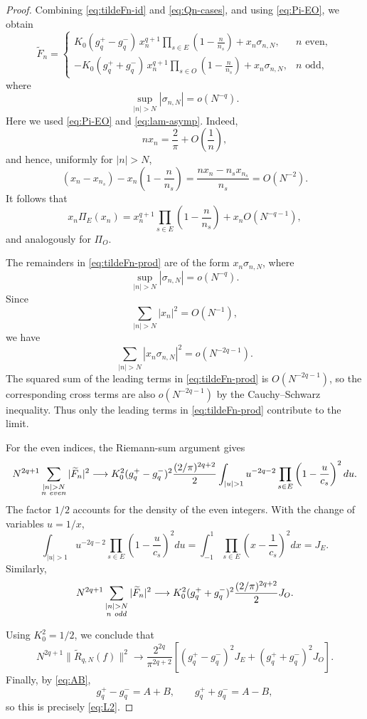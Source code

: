 \documentclass[10pt,a4paper]{amsart}
\begin{document}
\begin{proof}
Combining \eqref{eq:tildeFn-id} and \eqref{eq:Qn-cases}, and using
\eqref{eq:Pi-EO}, we obtain
\begin{equation}\label{eq:tildeFn-prod}
\widetilde F_n
=
\begin{cases}
\displaystyle
K_0(g_q^+-g_q^-)\,
x_n^{q+1}
\prod_{s\in E}
\left(1-\frac{n}{n_s}\right)
+x_n\sigma_{n,N},
& n\text{ even},
\\[4mm]
\displaystyle
-K_0(g_q^++g_q^-)\,
x_n^{q+1}
\prod_{s\in O}
\left(1-\frac{n}{n_s}\right)
+x_n\sigma_{n,N},
& n\text{ odd},
\end{cases}
\end{equation}
where
\[
\sup_{|n|>N}|\sigma_{n,N}|=o(N^{-q}).
\]
Here we used \eqref{eq:Pi-EO} and \eqref{eq:lam-asymp}. Indeed,
\[
nx_n=\frac{2}{\pi}+O\!\left(\frac{1}{n}\right),
\]
and hence, uniformly for $|n|>N$,
\[
(x_n-x_{n_s})
-
x_n\left(1-\frac{n}{n_s}\right)
=
\frac{nx_n-n_sx_{n_s}}{n_s}
=
O(N^{-2}).
\]
It follows that
\[
x_n\Pi_E(x_n)
=
x_n^{q+1}
\prod_{s\in E}
\left(1-\frac{n}{n_s}\right)
+
x_nO(N^{-q-1}),
\]
and analogously for $\Pi_O$.

The remainders in \eqref{eq:tildeFn-prod} are of the form
$x_n\sigma_{n,N}$, where
\[
\sup_{|n|>N}|\sigma_{n,N}|=o(N^{-q}).
\]
Since
\[
\sum_{|n|>N}|x_n|^2=O(N^{-1}),
\]
we have
\[
\sum_{|n|>N}|x_n\sigma_{n,N}|^2
=
o(N^{-2q-1}).
\]
The squared sum of the leading terms in \eqref{eq:tildeFn-prod} is
$O(N^{-2q-1})$, so the corresponding cross terms are also
$o(N^{-2q-1})$ by the Cauchy--Schwarz inequality. Thus only the
leading terms in \eqref{eq:tildeFn-prod} contribute to the limit.

For the even indices, the Riemann-sum argument gives
\[
\begin{aligned}
N^{2q+1}
\sum_{\substack{|n|>N\\ n\ {\rm even}}}
|\widetilde F_n|^2
\longrightarrow
K_0^2(g_q^+-g_q^-)^2
\frac{(2/\pi)^{2q+2}}{2}
\int_{|u|>1}
u^{-2q-2}
\prod_{s\in E}
\left(1-\frac{u}{c_s}\right)^2du.
\end{aligned}
\]
The factor $1/2$ accounts for the density of the even integers.
With the change of variables $u=1/x$,
\[
\int_{|u|>1}
u^{-2q-2}
\prod_{s\in E}
\left(1-\frac{u}{c_s}\right)^2du
=
\int_{-1}^{1}
\prod_{s\in E}
\left(x-\frac{1}{c_s}\right)^2dx
=
J_E.
\]
Similarly,
\[
N^{2q+1}
\sum_{\substack{|n|>N\\ n\ {\rm odd}}}
|\widetilde F_n|^2
\longrightarrow
K_0^2(g_q^++g_q^-)^2
\frac{(2/\pi)^{2q+2}}{2}
J_O.
\]

Using $K_0^2=1/2$, we conclude that
\[
N^{2q+1}\|\widetilde R_{q,N}(f)\|^2
\longrightarrow
\frac{2^{2q}}{\pi^{2q+2}}
\left[
(g_q^+-g_q^-)^2J_E
+
(g_q^++g_q^-)^2J_O
\right].
\]
Finally, by \eqref{eq:AB},
\[
g_q^+-g_q^-=A+B,
\qquad
g_q^++g_q^-=A-B,
\]
so this is precisely \eqref{eq:L2}.
\end{proof}
\end{document}
